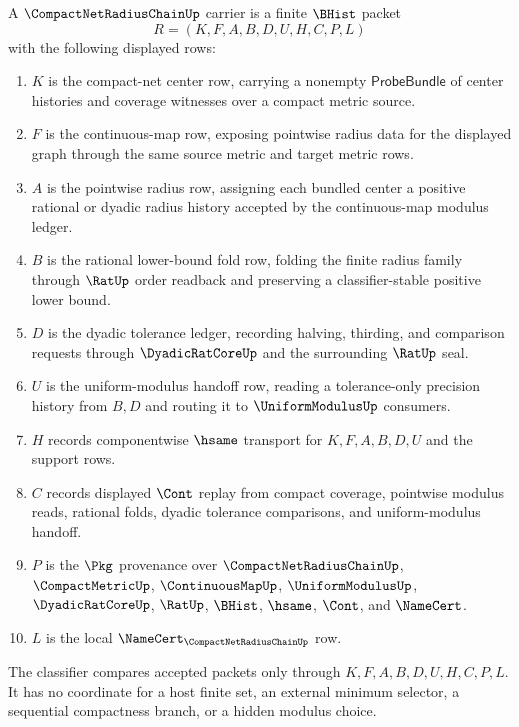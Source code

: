 \begin{definition}
\label{def:compact-net-radius-chain-carrier}
A $\CompactNetRadiusChainUp$ carrier is a finite $\BHist$ packet
$$
R=(K,F,A,B,D,U,H,C,P,L)
$$
with the following displayed rows:
\begin{enumerate}
\item $K$ is the compact-net center row, carrying a nonempty $\mathsf{ProbeBundle}$ of center histories and coverage witnesses over a compact metric source.
\item $F$ is the continuous-map row, exposing pointwise radius data for the displayed graph through the same source metric and target metric rows.
\item $A$ is the pointwise radius row, assigning each bundled center a positive rational or dyadic radius history accepted by the continuous-map modulus ledger.
\item $B$ is the rational lower-bound fold row, folding the finite radius family through $\RatUp$ order readback and preserving a classifier-stable positive lower bound.
\item $D$ is the dyadic tolerance ledger, recording halving, thirding, and comparison requests through $\DyadicRatCoreUp$ and the surrounding $\RatUp$ seal.
\item $U$ is the uniform-modulus handoff row, reading a tolerance-only precision history from $B,D$ and routing it to $\UniformModulusUp$ consumers.
\item $H$ records componentwise $\hsame$ transport for $K,F,A,B,D,U$ and the support rows.
\item $C$ records displayed $\Cont$ replay from compact coverage, pointwise modulus reads, rational folds, dyadic tolerance comparisons, and uniform-modulus handoff.
\item $P$ is the $\Pkg$ provenance over $\CompactNetRadiusChainUp$, $\CompactMetricUp$, $\ContinuousMapUp$, $\UniformModulusUp$, $\DyadicRatCoreUp$, $\RatUp$, $\BHist$, $\hsame$, $\Cont$, and $\NameCert$.
\item $L$ is the local $\NameCert_{\CompactNetRadiusChainUp}$ row.
\end{enumerate}
The classifier compares accepted packets only through $K,F,A,B,D,U,H,C,P,L$. It has no coordinate for a host finite set, an external minimum selector, a sequential compactness branch, or a hidden modulus choice.
\end{definition}

